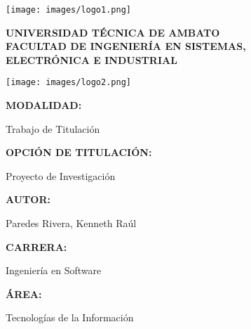 \documentclass[12pt, oneside]{article}
\begin{document}
\begin{titlepage}
    \centering
    
    \begin{minipage}{0.1\textwidth}
        \texttt{[image: images/logo1.png]}
    \end{minipage}
    \hfill
    \begin{minipage}{0.55\textwidth}
        \centering
        {\small \textbf{UNIVERSIDAD TÉCNICA DE AMBATO}} \\
        \vspace{0.18cm}
        {\normalsize \textbf{FACULTAD DE INGENIERÍA EN SISTEMAS,}} \\
        {\normalsize \textbf{ELECTRÓNICA E INDUSTRIAL}}
    \end{minipage}
    \hfill
    \begin{minipage}{0.18\textwidth}
        \texttt{[image: images/logo2.png]}
    \end{minipage}
    
    \vspace{2cm}
    
    \raggedright
    \textbf{MODALIDAD:} \\
    \begin{center}Trabajo de Titulación\end{center}
    
    \vspace{0.8cm}
    \textbf{OPCIÓN DE TITULACIÓN:} \\
    \begin{center}Proyecto de Investigación\end{center}
    
    \vspace{0.8cm}
    \textbf{AUTOR:} \\
    \begin{center}Paredes Rivera, Kenneth Raúl\end{center}
    
    \vspace{0.8cm}
    \textbf{CARRERA:} \\
    \begin{center}Ingeniería en Software\end{center}
    
    \vspace{0.8cm}
    \textbf{ÁREA:} \\
    \begin{center}Tecnologías de la Información\end{center}
    

\end{titlepage}
\end{document}
